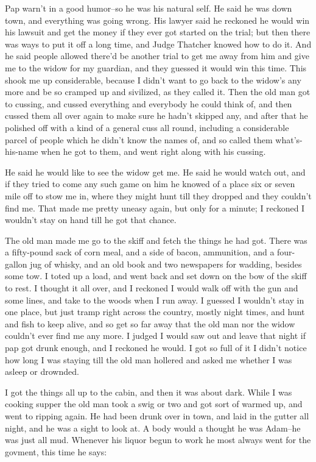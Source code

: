 Pap warn't in a good humor--so he was his natural self.  He said he was
down town, and everything was going wrong.  His lawyer said he reckoned
he would win his lawsuit and get the money if they ever got started on
the trial; but then there was ways to put it off a long time, and Judge
Thatcher knowed how to do it.  And he said people allowed there'd be
another trial to get me away from him and give me to the widow for my
guardian, and they guessed it would win this time.  This shook me up
considerable, because I didn't want to go back to the widow's any more
and be so cramped up and sivilized, as they called it.  Then the old man
got to cussing, and cussed everything and everybody he could think of,
and then cussed them all over again to make sure he hadn't skipped any,
and after that he polished off with a kind of a general cuss all round,
including a considerable parcel of people which he didn't know the names
of, and so called them what's-his-name when he got to them, and went
right along with his cussing.

He said he would like to see the widow get me.  He said he would watch
out, and if they tried to come any such game on him he knowed of a place
six or seven mile off to stow me in, where they might hunt till they
dropped and they couldn't find me.  That made me pretty uneasy again, but
only for a minute; I reckoned I wouldn't stay on hand till he got that
chance.

The old man made me go to the skiff and fetch the things he had got.
There was a fifty-pound sack of corn meal, and a side of bacon,
ammunition, and a four-gallon jug of whisky, and an old book and two
newspapers for wadding, besides some tow.  I toted up a load, and went
back and set down on the bow of the skiff to rest.  I thought it all
over, and I reckoned I would walk off with the gun and some lines, and
take to the woods when I run away.  I guessed I wouldn't stay in one
place, but just tramp right across the country, mostly night times, and
hunt and fish to keep alive, and so get so far away that the old man nor
the widow couldn't ever find me any more.  I judged I would saw out and
leave that night if pap got drunk enough, and I reckoned he would.  I got
so full of it I didn't notice how long I was staying till the old man
hollered and asked me whether I was asleep or drownded.

I got the things all up to the cabin, and then it was about dark.  While
I was cooking supper the old man took a swig or two and got sort of
warmed up, and went to ripping again.  He had been drunk over in town,
and laid in the gutter all night, and he was a sight to look at.  A body
would a thought he was Adam--he was just all mud.  Whenever his liquor
begun to work he most always went for the govment, this time he says:

